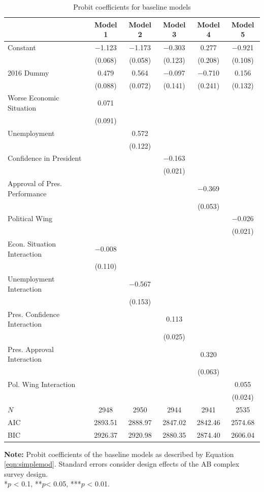 \documentclass[12pt,a4]{article}\usepackage[]{graphicx}\usepackage[]{xcolor}
\begin{document}
\begin{table}[htbp]
\caption{Probit coefficients for baseline models}
\label{tab:probitsimp}

\begin{tabular}[t]{lccccc}
\toprule
  & Model 1 & Model 2 & Model 3 & Model 4 & Model 5\\
\midrule
Constant & \num{-1.123} & \num{-1.173} & \num{-0.303} & \num{0.277} & \num{-0.921}\\
 & (\num{0.068}) & (\num{0.058}) & (\num{0.123}) & (\num{0.208}) & (\num{0.108})\\
2016 Dummy & \num{0.479} & \num{0.564} & \num{-0.097} & \num{-0.710} & \num{0.156}\\
 & (\num{0.088}) & (\num{0.072}) & (\num{0.141}) & (\num{0.241}) & (\num{0.132})\\
Worse Economic Situation & \num{0.071} &  &  &  & \\
 & (\num{0.091}) &  &  &  & \\
Unemployment &  & \num{0.572} &  &  & \\
 &  & (\num{0.122}) &  &  & \\
Confidence in President &  &  & \num{-0.163} &  & \\
 &  &  & (\num{0.021}) &  & \\
Approval of Pres. Performance &  &  &  & \num{-0.369} & \\
 &  &  &  & (\num{0.053}) & \\
Political Wing &  &  &  &  & \num{-0.026}\\
 &  &  &  &  & (\num{0.021})\\
Econ. Situation Interaction & \num{-0.008} &  &  &  & \\
 & (\num{0.110}) &  &  &  & \\
Unemployment Interaction &  & \num{-0.567} &  &  & \\
 &  & (\num{0.153}) &  &  & \\
Pres. Confidence Interaction &  &  & \num{0.113} &  & \\
 &  &  & (\num{0.025}) &  & \\
Pres. Approval Interaction &  &  &  & \num{0.320} & \\
 &  &  &  & (\num{0.063}) & \\
Pol. Wing Interaction &  &  &  &  & \num{0.055}\\
 &  &  &  &  & (\num{0.024})\\
\midrule
$N$ & \num{2948} & \num{2950} & \num{2944} & \num{2941} & \num{2535}\\
AIC & \num{2893.51} & \num{2888.97} & \num{2847.02} & \num{2842.46} & \num{2574.68}\\
BIC & \num{2926.37} & \num{2920.98} & \num{2880.35} & \num{2874.40} & \num{2606.04}\\
\bottomrule
\end{tabular}


\vspace{0.25cm}
\textbf{Note:} Probit coefficients of the baseline models as described by Equation \ref{eqn:simplemod}. Standard errors consider design effects of the AB complex survey design.\\
*$p$ < 0.1, **$p$< 0.05, ***$p$ < 0.01.
\end{table}
\end{document}
